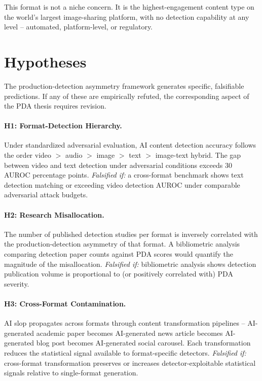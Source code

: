 \documentclass[12pt]{article}
\begin{document}
This format is not a niche concern. It is the highest-engagement content type on the world's largest image-sharing platform, with no detection capability at any level -- automated, platform-level, or regulatory.

\section{Hypotheses}

The production-detection asymmetry framework generates specific, falsifiable predictions. If any of these are empirically refuted, the corresponding aspect of the PDA thesis requires revision.

\paragraph{H1: Format-Detection Hierarchy.} Under standardized adversarial evaluation, AI content detection accuracy follows the order video $>$ audio $>$ image $>$ text $>$ image-text hybrid. The gap between video and text detection under adversarial conditions exceeds 30 AUROC percentage points. \textit{Falsified if:} a cross-format benchmark shows text detection matching or exceeding video detection AUROC under comparable adversarial attack budgets.

\paragraph{H2: Research Misallocation.} The number of published detection studies per format is inversely correlated with the production-detection asymmetry of that format. A bibliometric analysis comparing detection paper counts against PDA scores would quantify the magnitude of the misallocation. \textit{Falsified if:} bibliometric analysis shows detection publication volume is proportional to (or positively correlated with) PDA severity.

\paragraph{H3: Cross-Format Contamination.} AI slop propagates across formats through content transformation pipelines -- AI-generated academic paper becomes AI-generated news article becomes AI-generated blog post becomes AI-generated social carousel. Each transformation reduces the statistical signal available to format-specific detectors. \textit{Falsified if:} cross-format transformation preserves or increases detector-exploitable statistical signals relative to single-format generation.
\end{document}
